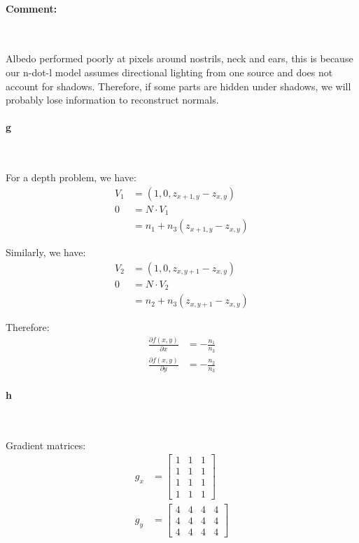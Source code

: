 \documentclass[11pt]{article} \usepackage{fullpage} \usepackage{graphicx} \usepackage{epstopdf} \usepackage{color} \usepackage{psfrag} \usepackage{pdfsync}\usepackage{indentfirst}\usepackage{subfigure}\usepackage{float}\usepackage[section]{placeins}
\begin{document}
\paragraph{Comment:}~{}

Albedo performed poorly at pixels around nostrils, neck and ears, this is because our n-dot-l model assumes directional lighting from one source and does not account for shadows. Therefore, if some parts are hidden under shadows, we will probably lose information to reconstruct normals.

\paragraph{g}~{}

For a depth problem, we have:
\begin{align}
	V_1 & = \left(1, 0, z_{x+1, y} - z_{x, y}\right) \\
	0 & = N \cdot V_1 \\
	& = n_1 + n_3\left(z_{x+1, y} - z_{x, y}\right)
\end{align}

Similarly, we have:
\begin{align}
	V_2 & = \left(1, 0, z_{x, y+1} - z_{x, y}\right) \\
	0 & = N \cdot V_2 \\
	& = n_2 + n_3\left(z_{x, y+1} - z_{x, y}\right)
\end{align}

Therefore:
\begin{align}
	\frac{\partial{f\left(x, y\right)}}{\partial{x}} & = -\frac{n_1}{n_3} \\
	\frac{\partial{f\left(x, y\right)}}{\partial{y}} & = -\frac{n_2}{n_3}
\end{align}

\paragraph{h}~{}

Gradient matrices:
\begin{align}
	g_x & = \begin{bmatrix} 1 & 1 & 1  \\ 1 & 1 & 1 \\ 1 & 1 & 1 \\ 1 & 1 & 1 \end{bmatrix} \\
	g_y & = \begin{bmatrix} 4 & 4 & 4 & 4 \\ 4 & 4 & 4 & 4 \\ 4 & 4 & 4 & 4 \end{bmatrix}
\end{align}
\end{document}
